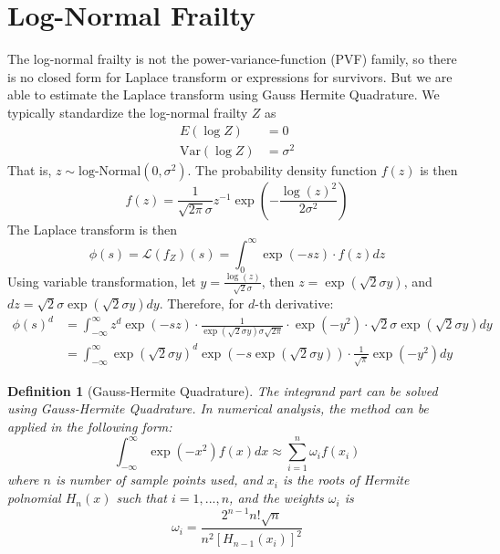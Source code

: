 \documentclass[preprint,12pt]{elsarticle}
\newtheorem{defn}{Definition}
\begin{document}
\section{Log-Normal Frailty}\label{sec:lognormfr}
The log-normal frailty is not the power-variance-function (PVF) family, so there is no closed form for Laplace transform or expressions for survivors. But we are able to estimate the Laplace transform using Gauss Hermite Quadrature. We typically standardize the log-normal frailty $Z$ as
\begin{align} 
    E(\log Z)&=0\\
    \text{Var}(\log Z)&=\sigma^2
\end{align} 
That is, $z\sim \text{log-Normal}(0, \sigma^2)$. The probability density function $f(z)$ is then
\begin{equation}\label{eq:lognormalfrailty}
    f(z)=\frac{1}{\sqrt{2\pi}\sigma}z^{-1}\exp (-\frac{\log (z)^2}{2\sigma^2})
\end{equation}
The Laplace transform is then
\begin{equation}
    \phi(s)=\mathscr{L}(f_Z)(s)=\int_0^{\infty}\exp(-sz)\cdot f(z)dz
\end{equation}
Using variable transformation, let $y=\frac{\log(z)}{\sqrt{2}\sigma}$, then $z=\exp(\sqrt{2}\sigma y)$, and $dz=\sqrt{2}\sigma\exp(\sqrt{2}\sigma y)dy$. Therefore, for $d$-th derivative:
\begin{align}
    \phi(s)^d&=\int_{-\infty}^{\infty}z^d\exp(-sz)\cdot\frac{1}{\exp(\sqrt{2}\sigma y)\sigma\sqrt{2\pi}}\cdot\exp(-y^2)\cdot\sqrt{2}\sigma\exp(\sqrt{2}\sigma y)dy\\
    &=\int_{-\infty}^{\infty}\exp(\sqrt{2}\sigma y)^d\exp(-s\exp(\sqrt{2}\sigma y))\cdot\frac{1}{\sqrt{\pi}}\exp(-y^2)dy
\end{align}
\begin{defn}[Gauss-Hermite Quadrature]\label{defn:gausshermite}
    The integrand part can be solved using Gauss-Hermite Quadrature. In numerical analysis, the method can be applied in the following form:
\begin{equation}
    \int_{-\infty}^{\infty}\exp(-x^2)f(x)dx\approx \sum_{i=1}^n\omega_i f(x_i)
\end{equation}
where $n$ is number of sample points used, and $x_i$ is the roots of Hermite polnomial $H_n (x)$ such that $i=1, ..., n$, and the weights $\omega_i$ is 
\begin{equation}
    \omega_i=\frac{2^{n-1}n!\sqrt{n}}{n^2[H_{n-1}(x_i)]^2}
\end{equation}
\end{defn}
\end{document}

